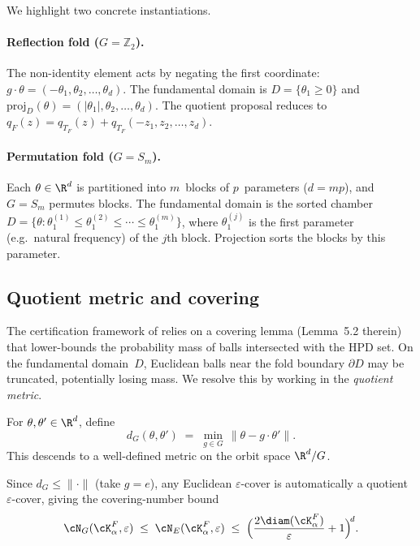 \medskip
\noindent
We highlight two concrete instantiations.

\paragraph{Reflection fold ($G = \mathbb{Z}_2$).}
The non-identity element acts by negating the first coordinate:
$g \cdot \theta = (-\theta_1, \theta_2, \ldots, \theta_d)$.
The fundamental domain is $D = \{\theta_1 \geq 0\}$ and
$\mathrm{proj}_D(\theta) = (|\theta_1|, \theta_2, \ldots, \theta_d)$.
The quotient proposal reduces to
$q_F(z) = q_{T_F}(z) + q_{T_F}(-z_1, z_2, \ldots, z_d)$.

\paragraph{Permutation fold ($G = S_m$).}
Each $\theta \in \R^d$ is partitioned into $m$~blocks of $p$~parameters
($d = mp$), and $G = S_m$ permutes blocks.
The fundamental domain is the sorted chamber
$D = \{\theta : \theta^{(1)}_1 \leq \theta^{(2)}_1 \leq \cdots
\leq \theta^{(m)}_1\}$, where $\theta^{(j)}_1$ is the first parameter
(e.g.\ natural frequency) of the $j$th block.
Projection sorts the blocks by this parameter.


\subsection{Quotient metric and covering}
\label{sec:quotient_metric}

The certification framework of \citet{LCNF} relies on a covering
lemma (Lemma~5.2 therein) that lower-bounds the probability mass
of balls intersected with the HPD set.  On the fundamental domain~$D$,
Euclidean balls near the fold boundary $\partial D$ may be truncated,
potentially losing mass.  We resolve this by working in the
\emph{quotient metric}.

\begin{definition}\label{def:quotient_metric}
  For $\theta, \theta' \in \R^d$, define
  \begin{equation}\label{eq:d_G}
    d_G(\theta, \theta')
    \;=\; \min_{g \in G}\, \|\theta - g \cdot \theta'\|.
  \end{equation}
  This descends to a well-defined metric on the orbit space $\R^d/G$.
\end{definition}

\noindent
Since $d_G \leq \|\cdot\|$ (take $g = e$), any Euclidean
$\varepsilon$-cover is automatically a quotient $\varepsilon$-cover,
giving the covering-number bound
\begin{equation}\label{eq:covering_number}
  \cN_G(\cK_\alpha^F, \varepsilon)
  \;\leq\;
  \cN_E(\cK_\alpha^F, \varepsilon)
  \;\leq\;
  \Bigl(\frac{2\diam(\cK_\alpha^F)}{\varepsilon} + 1\Bigr)^{\!d}.
\end{equation}

